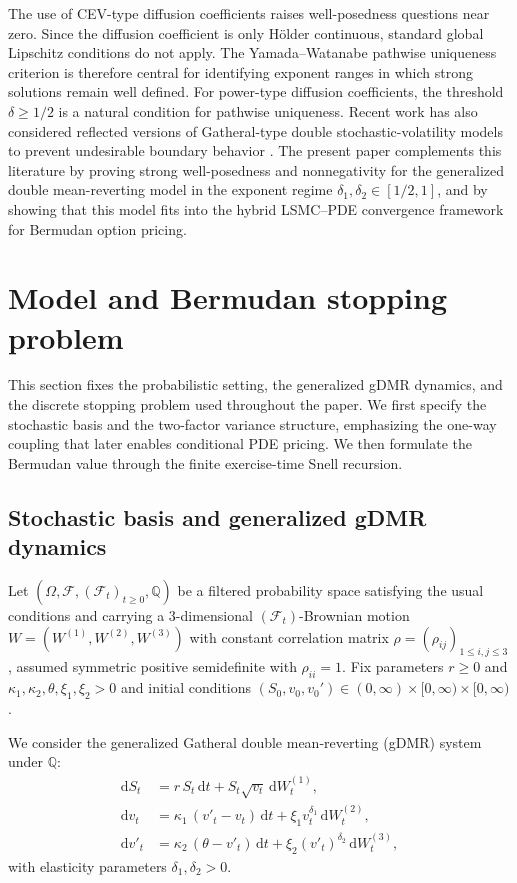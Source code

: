 \documentclass[10pt]{article}
\theoremstyle{plain}
\theoremstyle{definition}
\theoremstyle{remark}
\newcommand{\dd}{\mathrm d}
\newcommand{\Q}{\mathbb Q}
\newcommand{\F}{\mathcal F}
\begin{document}
The use of CEV-type diffusion coefficients raises well-posedness questions near zero. Since the diffusion coefficient is only H\"older continuous, standard global Lipschitz conditions do not apply. The Yamada--Watanabe pathwise uniqueness criterion \citep{yamada1971uniqueness} is therefore central for identifying exponent ranges in which strong solutions remain well defined. For power-type diffusion coefficients, the threshold $\delta\ge 1/2$ is a natural condition for pathwise uniqueness. Recent work has also considered reflected versions of Gatheral-type double stochastic-volatility models to prevent undesirable boundary behavior \citep{mishura2025skorokhod}. The present paper complements this literature by proving strong well-posedness and nonnegativity for the generalized double mean-reverting model in the exponent regime $\delta_1,\delta_2\in[1/2,1]$, and by showing that this model fits into the hybrid LSMC--PDE convergence framework for Bermudan option pricing.



\section{Model and Bermudan stopping problem}\label{sec:model}

This section fixes the probabilistic setting, the generalized gDMR dynamics, and the discrete stopping problem used throughout the paper. We first specify the stochastic basis and the two-factor variance structure, emphasizing the one-way coupling that later enables conditional PDE pricing. We then formulate the Bermudan value through the finite exercise-time Snell recursion.

\subsection{Stochastic basis and generalized gDMR dynamics}

Let $(\Omega,\F,(\F_t)_{t\ge 0},\Q)$ be a filtered probability space satisfying the usual conditions and carrying
a $3$-dimensional $(\F_t)$-Brownian motion $W=(W^{(1)},W^{(2)},W^{(3)})$ with constant correlation matrix
$\rho=(\rho_{ij})_{1\le i,j\le 3}$, assumed symmetric positive semidefinite with $\rho_{ii}=1$.
Fix parameters $r\ge 0$ and $\kappa_1,\kappa_2,\theta,\xi_1,\xi_2>0$ and initial conditions
$(S_0,v_0,v_0')\in(0,\infty)\times[0,\infty)\times[0,\infty)$.

We consider the generalized Gatheral double mean-reverting (gDMR) system under $\Q$:
\begin{equation}\label{eq:gdmr}
\begin{aligned}
\dd S_t &= r\,S_t\,\dd t + S_t\sqrt{v_t}\,\dd W^{(1)}_t,\\
\dd v_t &= \kappa_1\,(v'_t - v_t)\,\dd t + \xi_1 v_t^{\delta_1}\,\dd W^{(2)}_t,\\
\dd v'_t &= \kappa_2\,(\theta - v'_t)\,\dd t + \xi_2 (v'_t)^{\delta_2}\,\dd W^{(3)}_t,
\end{aligned}
\end{equation}
with elasticity parameters $\delta_1,\delta_2>0$.
\end{document}
